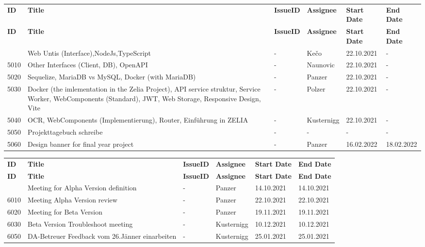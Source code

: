 \begin{longtable}{|p{}|p{}|p{}|p{}|p{}|p{}|} \hline
    \textbf{ID} & \textbf{Title} & \textbf{Issue\-ID} & \textbf{Assignee} & \textbf{Start Date} & \textbf{End\- Date} \\ \hhline{|=|=|=|=|=|=|}
    \endfirsthead
    \hline
    \textbf{ID} & \textbf{Title} & \textbf{Issue\-ID} & \textbf{Assignee} & \textbf{Start Date} & \textbf{End\- Date} \\ \hhline{|=|=|=|=|=|=|}
    \endhead
    5000 & Web Untis (Interface),NodeJs,TypeScript & - & Kečo & 22.10.2021 & - \\ \hline
    5010 & Other Interfaces (Client, DB), OpenAPI & - & Naunovic & 22.10.2021 & - \\ \hline
    5020 & Sequelize, MariaDB vs MySQL, Docker (with MariaDB) & - & Panzer & 22.10.2021 & - \\ \hline
    5030 & Docker (the imlementation in the Zelia Project), API service struktur, Service Worker, WebComponents (Standard), JWT, Web Storage, Responsive Design, Vite & - & Polzer & 22.10.2021 & - \\ \hline
    5040 & OCR, WebComponents (Implementierung), Router, Einführung in ZELIA & - & Kusternigg & 22.10.2021 & - \\ \hline
    5050 & Projekttagebuch schreibe & - & - & - & - \\ \hline
    5060 & Design banner for final year project & - & Panzer & 16.02.2022 & 18.02.2022 \\ \hline
\end{longtable}


\begin{longtable}{|p{}|p{}|p{}|p{}|p{}|p{}|} \hline
    \textbf{ID} & \textbf{Title} & \textbf{Issue\-ID} & \textbf{Assignee} & \textbf{Start Date} & \textbf{End\- Date} \\ \hhline{|=|=|=|=|=|=|}
    \endfirsthead
    \hline
    \textbf{ID} & \textbf{Title} & \textbf{Issue\-ID} & \textbf{Assignee} & \textbf{Start Date} & \textbf{End\- Date} \\ \hhline{|=|=|=|=|=|=|}
    \endhead
    6000 & Meeting for Alpha Version definition  & - & Panzer & 14.10.2021 & 14.10.2021 \\ \hline
    6010 & Meeting Alpha Version review  & - & Panzer & 22.10.2021 & 22.10.2021 \\ \hline
    6020 & Meeting for Beta Version & - & Panzer & 19.11.2021 & 19.11.2021 \\ \hline
    6030 & Beta Version Troubleshoot meeting & - & Kusternigg & 10.12.2021 & 10.12.2021 \\ \hline
    6050 & DA-Betreuer Feedback vom 26.Jänner einarbeiten & - & Kusternigg & 25.01.2021 & 25.01.2021 \\ \hline
\end{longtable}

